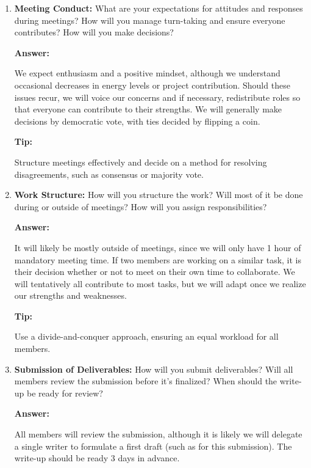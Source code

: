 \documentclass[12pt]{article}
\newenvironment{answer}[1][]{
  \color{blue}\textbf{Answer:}
}{}
\newenvironment{alice}[1][]{
  \color{black}\textbf{Tip:}
}{}
\begin{document}
\begin{enumerate}
\item {\bf Meeting Conduct:} What are your expectations for attitudes and responses during meetings? How will you manage turn-taking and ensure everyone contributes? How will you make decisions?

\begin{answer}
  We expect enthusiasm and a positive mindset, although we understand occasional decreases in energy levels or project contribution. Should these issues recur, we will voice our concerns and if necessary, redistribute roles so that everyone can contribute to their strengths. We will generally make decisions by democratic vote, with ties decided by flipping a coin.
\end{answer}

\begin{alice}

Structure meetings effectively and decide on a method for resolving disagreements, such as consensus or majority vote.
\end{alice}

\item {\bf Work Structure:} How will you structure the work? Will most of it be done during or outside of meetings? How will you assign responsibilities?

\begin{answer}
  It will likely be mostly outside of meetings, since we will only have 1 hour of mandatory meeting time. If two members are working on a similar task, it is their decision whether or not to meet on their own time to collaborate. We will tentatively all contribute to most tasks, but we will adapt once we realize our strengths and weaknesses.
\end{answer}

\begin{alice}

Use a divide-and-conquer approach, ensuring an equal workload for all members.
\end{alice}

\item {\bf Submission of Deliverables:} How will you submit deliverables? Will all members review the submission before it’s finalized? When should the write-up be ready for review?

\begin{answer}

All members will review the submission, although it is likely we will delegate a single writer to formulate a first draft (such as for this submission). The write-up should be ready 3 days in advance.
\end{answer}


\end{enumerate}
\end{document}
